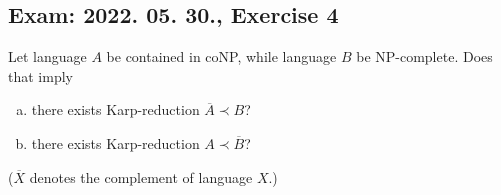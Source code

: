 \subsection{Exam: 2022. 05. 30., Exercise 4}


Let language $A$ be contained in coNP, while language $B$ be NP-complete.
Does that imply

\begin{enumerate}[a)]
    \item there exists Karp-reduction $\overline{A} \prec B$?
    \item there exists Karp-reduction $A \prec \overline{B}$?
\end{enumerate}

($\overline{X}$ denotes the complement of language $X$.)



